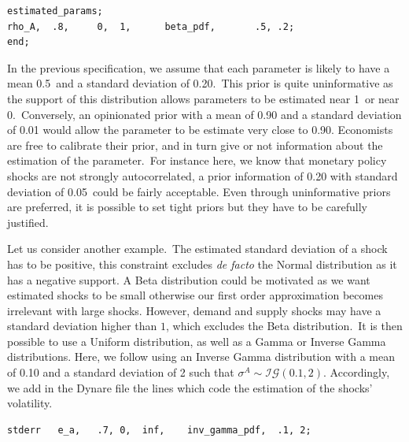 \documentclass[a4paper,12pt]{article}%
\begin{document}
\vspace{1ex}
\begin{verbatim}
estimated_params;
rho_A,	.8,		0,	1,		beta_pdf,		.5,	.2;
end;
\end{verbatim}
\vspace{1ex}%


In the previous specification, we assume that each parameter is likely to have
a mean 0\textsf{.5}\ and a standard deviation of 0.20.\ This prior is quite
uninformative as the support of this distribution allows parameters to be
estimated near 1\ or near 0.\ Conversely, an opinionated prior with a mean of
0.90 and a standard deviation of 0.01 would allow the parameter to be estimate
very close to 0.90. Economists are free to calibrate their prior, and in turn
give or not information about the estimation of the parameter.\ For instance
here, we know that monetary policy shocks are not strongly autocorrelated, a
prior information of 0.20 with standard deviation of 0.05\ could be fairly
acceptable. Even through uninformative priors are preferred, it is possible to
set tight priors but they have to be carefully justified.

Let us consider another example.\ The estimated standard deviation of a shock
has to be positive, this constraint excludes \textit{de facto} the Normal
distribution as it has a negative support. A Beta distribution could be
motivated as we want estimated shocks to be small otherwise our first order
approximation becomes irrelevant with large shocks. However, demand and supply
shocks may have a standard deviation higher than $1$, which excludes the Beta
distribution.\ It is then possible to use a Uniform distribution, as well as a
Gamma or Inverse Gamma distributions. Here, we follow \cite{smets2007shocks}
using an Inverse Gamma distribution with a mean of 0.10 and a standard
deviation of 2 such that $\sigma^{A}\sim\mathcal{IG}(0.1,2)$. Accordingly, we
add in the Dynare file the lines which code the estimation of the shocks' volatility.%

\vspace{1ex}
\begin{verbatim}
stderr   e_a,	.7,	0,	inf,	inv_gamma_pdf,	.1,	2;
\end{verbatim}
\vspace{1ex}%
\end{document}
